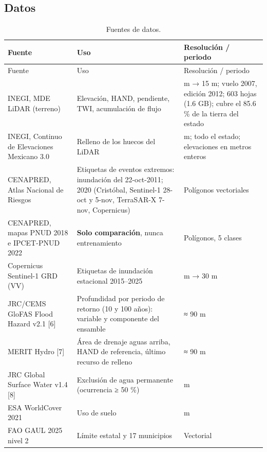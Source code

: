\subsection{Datos}

\begin{longtable}[]{@{}
  >{\raggedright\arraybackslash}p{}
  >{\raggedright\arraybackslash}p{}
  >{\raggedright\arraybackslash}p{}@{}}
\caption{Fuentes de datos.}\tabularnewline
\toprule\noalign{}
\begin{minipage}[b]{\linewidth}\raggedright
Fuente
\end{minipage} & \begin{minipage}[b]{\linewidth}\raggedright
Uso
\end{minipage} & \begin{minipage}[b]{\linewidth}\raggedright
Resolución / periodo
\end{minipage} \\
\midrule\noalign{}
\endfirsthead
\toprule\noalign{}
\begin{minipage}[b]{\linewidth}\raggedright
Fuente
\end{minipage} & \begin{minipage}[b]{\linewidth}\raggedright
Uso
\end{minipage} & \begin{minipage}[b]{\linewidth}\raggedright
Resolución / periodo
\end{minipage} \\
\midrule\noalign{}
\endhead
\bottomrule\noalign{}
\endlastfoot
INEGI, MDE LiDAR (terreno) & Elevación, HAND, pendiente, TWI, acumulación de flujo & 5 m → 15 m; vuelo 2007, edición 2012; 603 hojas (1.6 GB); cubre el 85.6 \% de la tierra del estado \\
INEGI, Continuo de Elevaciones Mexicano 3.0 & Relleno de los huecos del LiDAR & 15 m; todo el estado; elevaciones en metros enteros \\
CENAPRED, Atlas Nacional de Riesgos & Etiquetas de eventos extremos: inundación del 22-oct-2011; 2020 (Cristóbal, Sentinel-1 28-oct y 5-nov, TerraSAR-X 7-nov, Copernicus) & Polígonos vectoriales \\
CENAPRED, mapas PNUD 2018 e IPCET-PNUD 2022 & \textbf{Solo comparación}, nunca entrenamiento & Polígonos, 5 clases \\
Copernicus Sentinel-1 GRD (VV) & Etiquetas de inundación estacional 2015--2025 & 10 m → 30 m \\
JRC/CEMS GloFAS Flood Hazard v2.1 {[}6{]} & Profundidad por periodo de retorno (10 y 100 años): variable y componente del ensamble & ≈ 90 m \\
MERIT Hydro {[}7{]} & Área de drenaje aguas arriba, HAND de referencia, último recurso de relleno & ≈ 90 m \\
JRC Global Surface Water v1.4 {[}8{]} & Exclusión de agua permanente (ocurrencia ≥ 50 \%) & 30 m \\
ESA WorldCover 2021 & Uso de suelo & 10 m \\
FAO GAUL 2025 nivel 2 & Límite estatal y 17 municipios & Vectorial \\
\end{longtable}

